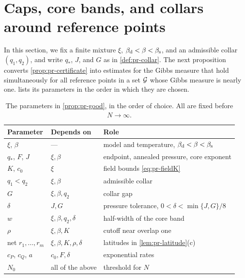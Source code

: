 \section{Caps, core bands, and collars around reference points}\label{sec:pr-good}

In this section, we fix a finite mixture $\xi$, $\beta_{\mathrm d}<\beta<\beta_{\mathrm s}$, and an admissible collar $(q_1,q_2)$, and write $q_*$, $J$, and $G$ as in \cref{def:pr-collar}. The next proposition converts \cref{prop:pr-certificate} into estimates for the Gibbs measure that hold simultaneously for all reference points in a set $\mathcal G$ whose Gibbs measure is nearly one.  lists its parameters in the order in which they are chosen.

\begin{table}[ht]
\centering
\small
\begin{tabular}{@{}lll@{}}
\toprule
Parameter & Depends on & Role\\
\midrule
$\xi$, $\beta$ & --- & model and temperature, $\beta_{\mathrm d}<\beta<\beta_{\mathrm s}$\\
$q_*$, $F$, $J$ & $\xi,\beta$ & endpoint, annealed pressure, core exponent\\
$K$, $c_0$ & $\xi$ & field bounds \eqref{eq:pr-fieldK}\\
$q_1<q_2$ & $\xi,\beta$ & admissible collar\\
$G$ & $\xi,\beta,q_2$ & collar gap\\
$\delta$ & $J,G$ & pressure tolerance, $0<\delta<\min\{J,G\}/8$\\
$w$ & $\xi,\beta,q_2,\delta$ & half-width of the core band\\
$\rho$ & $\xi,\beta,K$ & cutoff near overlap one\\
net $r_1,\dots,r_m$ & $\xi,\beta,K,\rho,\delta$ & latitudes in \cref{lem:pr-latitude}(c)\\
$c_P$, $c_Q$, $a$ & $c_0,F,\delta$ & exponential rates\\
$N_0$ & all of the above & threshold for $N$\\
\bottomrule
\end{tabular}
\caption{The parameters in \cref{prop:pr-good}, in the order of choice. All are fixed before $N\to\infty$.}
\label{tab:pr-parameters}
\end{table}

